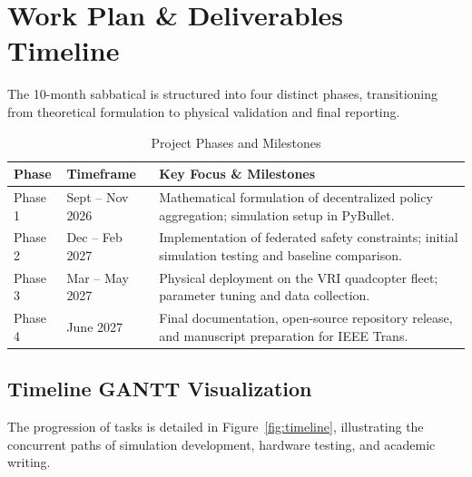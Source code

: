 \section{Work Plan \& Deliverables Timeline}
The 10-month sabbatical is structured into four distinct phases, transitioning from theoretical formulation to physical validation and final reporting.

\begin{table}[h!]
\centering
\caption{Project Phases and Milestones}
\label{tab:phases}
\begin{tabularx}{\textwidth}{l l X}
\toprule
\textbf{Phase} & \textbf{Timeframe} & \textbf{Key Focus \& Milestones} \\
\midrule
Phase 1 & Sept -- Nov 2026 & Mathematical formulation of decentralized policy aggregation; simulation setup in PyBullet. \\
Phase 2 & Dec -- Feb 2027 & Implementation of federated safety constraints; initial simulation testing and baseline comparison. \\
Phase 3 & Mar -- May 2027 & Physical deployment on the VRI quadcopter fleet; parameter tuning and data collection. \\
Phase 4 & June 2027 & Final documentation, open-source repository release, and manuscript preparation for IEEE Trans. \\
\bottomrule
\end{tabularx}
\end{table}

\subsection{Timeline GANTT Visualization}
The progression of tasks is detailed in Figure~\ref{fig:timeline}, illustrating the concurrent paths of simulation development, hardware testing, and academic writing.

